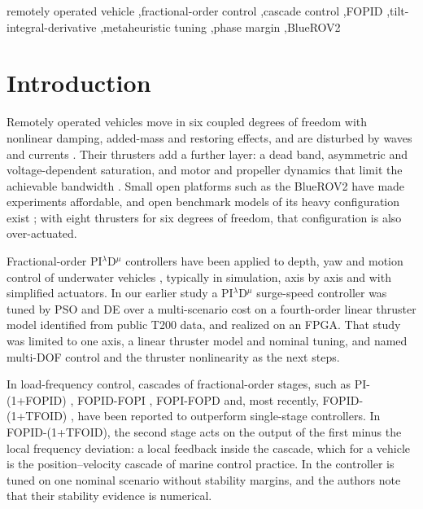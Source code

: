\documentclass[review,12pt]{elsarticle}
\begin{document}
\begin{frontmatter}
\begin{keyword}
remotely operated vehicle \sep fractional-order control \sep cascade control \sep FOPID \sep tilt-integral-derivative
\sep metaheuristic tuning \sep phase margin \sep BlueROV2
\end{keyword}

\end{frontmatter}

\section{Introduction}\label{sec:intro}

Remotely operated vehicles move in six coupled degrees of freedom with nonlinear damping, added-mass and
restoring effects, and are disturbed by waves and currents \cite{fossen2011}. Their thrusters add a further
layer: a dead band, asymmetric and voltage-dependent saturation, and motor and propeller dynamics that limit the
achievable bandwidth \cite{yoerger1990,bachmayer2000}. Small open platforms such as the BlueROV2 have made
experiments affordable, and open benchmark models of its heavy configuration exist \cite{vonbenzon2022}; with
eight thrusters for six degrees of freedom, that configuration is also over-actuated.

Fractional-order PI$^\lambda$D$^\mu$ controllers \cite{podlubny1999} have been applied to depth, yaw and
motion control of underwater vehicles \cite{joshi2013,wan2019,liu2022yaw,hasan2023}, typically in simulation,
axis by axis and with simplified actuators. In our earlier study \cite{ersoy2026jestech} a
PI$^\lambda$D$^\mu$ surge-speed controller was tuned by PSO \cite{kennedy1995pso} and DE \cite{storn1997de} over a
multi-scenario cost on a fourth-order linear thruster model identified from public T200 data, and realized on
an FPGA. That study was limited to one axis, a linear thruster model and nominal tuning, and named multi-DOF
control and the thruster nonlinearity as the next steps.

In load-frequency control, cascades of fractional-order stages, such as PI-(1+FOPID) \cite{hussain2025},
FOPID-FOPI \cite{barakat2022}, FOPI-FOPD \cite{celik2021} and, most recently, FOPID-(1+TFOID) \cite{nour2026scirep},
have been reported to outperform single-stage controllers. In FOPID-(1+TFOID), the second stage acts on the
output of the first minus the local frequency deviation: a local feedback inside the cascade, which for a
vehicle is the position--velocity cascade of marine control practice. In \cite{nour2026scirep} the controller is
tuned on one nominal scenario without stability margins, and the authors note that their stability evidence is
numerical.
\end{document}

